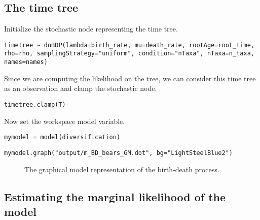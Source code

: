 \subsection{The time tree}

Initialize the stochastic node representing the time tree.
{\tt \begin{snugshade*}
\begin{lstlisting}
timetree ~ dnBDP(lambda=birth_rate, mu=death_rate, rootAge=root_time, rho=rho, samplingStrategy="uniform", condition="nTaxa", nTaxa=n_taxa, names=names)
\end{lstlisting}
\end{snugshade*}}

Since we are computing the likelihood on the \citet{dosReis2012} tree, we can consider this time tree as an observation and clamp the stochastic node.
{\tt \begin{snugshade*}
\begin{lstlisting}
timetree.clamp(T)
\end{lstlisting}
\end{snugshade*}}

Now set the workspace model variable.
{\tt \begin{snugshade*}
\begin{lstlisting}
mymodel = model(diversification)
\end{lstlisting}
\end{snugshade*}}

{\tt \begin{snugshade*}
\begin{lstlisting}
mymodel.graph("output/m_BD_bears_GM.dot", bg="LightSteelBlue2")
\end{lstlisting}
\end{snugshade*}}

\begin{figure}[h!]
\centering
{}
\caption{\small The graphical model representation of the birth-death process.}
\label{BDGMGVfig}
\end{figure}



\subsection{Estimating the marginal likelihood of the model}


